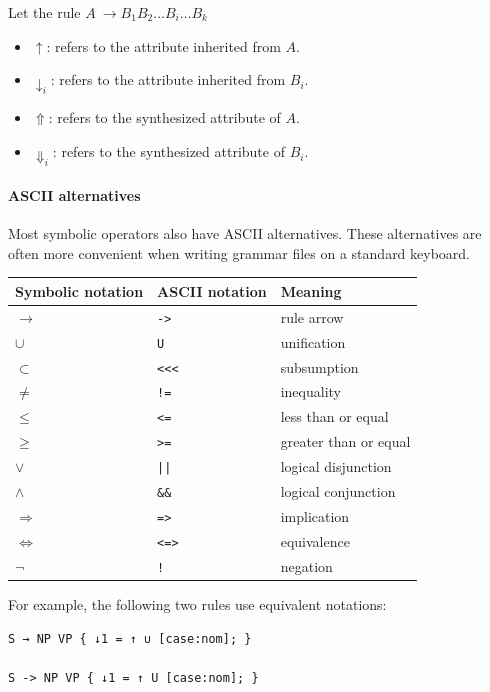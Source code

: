 \documentclass[11pt]{article}
\begin{document}
Let the rule
$A~ \rightarrow B_1 B_2 \dots B_i \dots B_k$

\begin{itemize}
	\item $\uparrow$: refers to the attribute inherited from $A$.
	\item $\downarrow_i$: refers to the attribute inherited from $B_i$.
	\item $\Uparrow$: refers to the synthesized attribute of $A$.
	\item $\Downarrow_i$: refers to the synthesized attribute of $B_i$.
\end{itemize}

\paragraph{ASCII alternatives}

Most symbolic operators also have ASCII alternatives.  These alternatives
are often more convenient when writing grammar files on a standard keyboard.

\begin{center}
\begin{tabular}{lll}
\hline
Symbolic notation & ASCII notation & Meaning \\
\hline
$\rightarrow$ & \verb#-># & rule arrow \\
$\cup$ & \verb#U# & unification \\
$\subset$ & \verb#<<<# & subsumption \\
$\neq$ & \verb#!=# & inequality \\
$\leq$ & \verb#<=# & less than or equal \\
$\geq$ & \verb#>=# & greater than or equal \\
$\lor$ & \verb#||# & logical disjunction \\
$\land$ & \verb#&&# & logical conjunction \\
$\Rightarrow$ & \verb#=># & implication \\
$\Leftrightarrow$ & \verb#<=># & equivalence \\
$\lnot$ & \verb#!# & negation \\
\hline
\end{tabular}
\end{center}

For example, the following two rules use equivalent notations:

\begin{lstlisting}[numbers=none]
S → NP VP { ↓1 = ↑ ∪ [case:nom]; }

S -> NP VP { ↓1 = ↑ U [case:nom]; }
\end{lstlisting}
\end{document}
